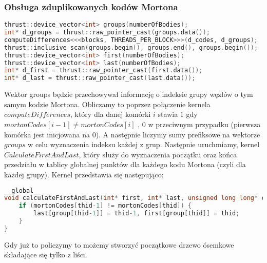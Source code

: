 \documentclass[14pt,twoside,a4paper]{article}
\theoremstyle{definition}
\begin{document}
\subsubsection{\large Obsługa zduplikowanych kodów Mortona}

\begin{lstlisting}[language=C++, frame=single, framerule=2pt, caption=Krok 3]
thrust::device_vector<int> groups(numberOfBodies);
int* d_groups = thrust::raw_pointer_cast(groups.data());
computeDifferences<<<blocks, THREADS_PER_BLOCK>>>(d_codes, d_groups);
thrust::inclusive_scan(groups.begin(), groups.end(), groups.begin());
thrust::device_vector<int> first(numberOfBodies);
thrust::device_vector<int> last(numberOfBodies);
int* d_first = thrust::raw_pointer_cast(first.data());
int* d_last = thrust::raw_pointer_cast(last.data());
\end{lstlisting}
\bigskip
Wektor groups będzie przechowywał informację o indeksie grupy węzłów o tym samym kodzie Mortona. Obliczamy to poprzez połączenie kernela $computeDifferences$, który dla danej komórki $i$ stawia $1$ gdy $mortonCodes[i-1] \ne mortonCodes[i]$ , $0$ w przeciwnym przypadku (pierwsza komórka jest inicjowana na $0$). 
A następnie liczymy sumy prefiksowe na wektorze $groups$ w celu wyznaczenia indeksu każdej z grup. Następnie uruchmiamy, kernel $CalculateFirstAndLast$, który służy do wyznaczenia początku oraz końca przedziału w tablicy globalnej punktów dla każdego kodu Mortona (czyli dla każdej grupy). Kernel przedstawia się następująco:
\begin{lstlisting}[language=C++, frame=single, framerule=2pt, caption=Kernel calculateFirstAndLast]
__global__
void calculateFirstAndLast(int* first, int* last, unsigned long long* codes, int numberOfBodies) {
    if (mortonCodes[thid-1] != mortonCodes[thid]) {
        last[group[thid-1]] = thid-1, first[group[thid]] = thid;
    }
}
\end{lstlisting}
\bigskip
Gdy już to policzymy to możemy stworzyć początkowe drzewo ósemkowe składające się tylko z liści.
\bigskip
{}              
\end{document}
